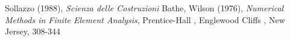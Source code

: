 \begin{thebibliography}{9}
	Sollazzo (1988), 
	\emph{Scienza delle Costruzioni}  
	Bathe, Wilson (1976),
	\emph{Numerical Methods in Finite Element Analysis}, Prentice-Hall , Englewood Cliffs , New Jersey, 308-344 
\end{thebibliography}
